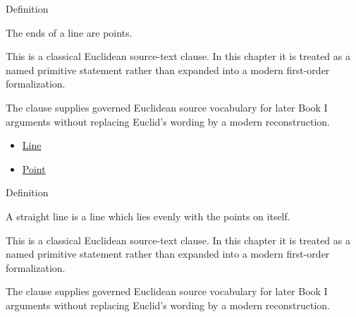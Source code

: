 \begin{lra-not-visible}
\DefinitionalRoot
\end{lra-not-visible}

\begin{definitionbox}{Definition}
\begin{definition}
\label{def:euclid-ends-of-a-line}
The ends of a line are points.
\end{definition}
\end{definitionbox}
\begin{remark*}
This is a classical Euclidean source-text clause. In this chapter it is treated
as a named primitive statement rather than expanded into a modern first-order
formalization.
\end{remark*}

\begin{remark*}[Interpretation]
The clause supplies governed Euclidean source vocabulary for later Book I
arguments without replacing Euclid's wording by a modern reconstruction.
\end{remark*}

\begin{lra-not-visible}
\begin{dependencies}
\begin{itemize}
  \item \hyperref[def:euclid-line]{Line}
  \item \hyperref[def:euclid-point]{Point}
\end{itemize}
\end{dependencies}
\end{lra-not-visible}

\begin{definitionbox}{Definition}
\begin{definition}
\label{def:euclid-straight-line}
A straight line is a line which lies evenly with the points on itself.
\end{definition}
\end{definitionbox}
\begin{remark*}
This is a classical Euclidean source-text clause. In this chapter it is treated
as a named primitive statement rather than expanded into a modern first-order
formalization.
\end{remark*}

\begin{remark*}[Interpretation]
The clause supplies governed Euclidean source vocabulary for later Book I
arguments without replacing Euclid's wording by a modern reconstruction.
\end{remark*}

